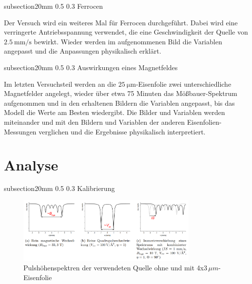 \documentclass[german, %
parskip=full, %
bibliography=totoc, %
]{scrartcl}
\makeatletter
\renewcommand\subsection{\@startsection 
   {subsection}{2}{0mm}%
   {0.5\baselineskip}%
   {0.3\baselineskip}%
   {\bfseries\sffamily\large}%
   }
\makeatother
\begin{document}
\subsection{Ferrocen}

Der Versuch wird ein weiteres Mal für Ferrocen durchgeführt. Dabei wird eine verringerte Antriebsspannung verwendet, die eine Geschwindigkeit der Quelle von \(\SI{2.5}{\milli\meter\per\second}\) bewirkt. Wieder werden im aufgenommenen Bild die Variablen angepasst und die Anpassungen physikalisch erklärt.

\subsection{Auswirkungen eines Magnetfeldes}

Im letzten Versuchsteil werden an die \(\SI{25}{\micro\meter}\)-Eisenfolie zwei unterschiedliche Magnetfelder angelegt, wieder über etwa 75 Minuten das Mößbauer-Spektrum aufgenommen und in den erhaltenen Bildern die Variablen angepasst, bis das Modell die Werte am Besten wiedergibt. Die Bilder und Variablen werden miteinander und mit den Bildern und Variablen der anderen Eisenfolien-Messungen verglichen und die Ergebnisse physikalisch interpretiert.  

\section{Analyse}

\subsection{Kalibrierung}

\begin{figure}[ht] 
  \centering
     \includegraphics[width=0.8\textwidth]{GraphMoessbauer}
  \caption{Pulshöhenspektren der verwendeten Quelle ohne und mit 4x$3\,\mu m$-Eisenfolie}
  \label{fig:pulsspektrum}
\end{figure}
\end{document}
